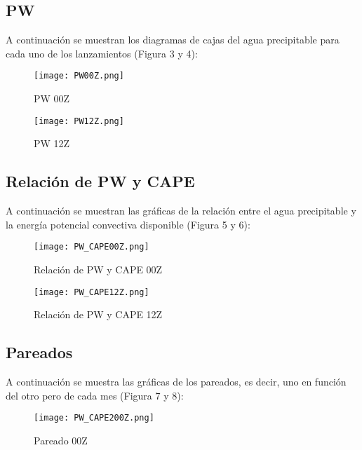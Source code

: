 \documentclass[12pt]{article}
\begin{document}
\subsection{PW}

A continuación se muestran los diagramas de cajas del agua precipitable para cada uno de los lanzamientos (Figura 3 y 4):

\begin{figure}
\begin{centering}
  \texttt{[image: PW00Z.png]}
  \caption{PW 00Z}
\end{centering}
\end{figure}

\begin{figure}
\begin{centering}
  \texttt{[image: PW12Z.png]}
  \caption{PW 12Z}
\end{centering}
\end{figure}

\subsection{Relación de PW y CAPE}

A continuación se muestran las gráficas de la relación entre el agua precipitable y la energía potencial convectiva disponible (Figura 5 y 6):

\begin{figure}
\begin{centering}
  \texttt{[image: PW\_CAPE00Z.png]}
  \caption{Relación de PW y CAPE 00Z}
\end{centering}
\end{figure}

\begin{figure}
\begin{centering}
  \texttt{[image: PW\_CAPE12Z.png]}
  \caption{Relación de PW y CAPE 12Z}
\end{centering}
\end{figure}

\subsection{Pareados}

A continuación se muestra las gráficas de los pareados, es decir, uno en función del otro pero de cada mes (Figura 7 y 8):

\begin{figure}
\begin{centering}
  \texttt{[image: PW\_CAPE200Z.png]}
  \caption{Pareado 00Z}
\end{centering}
\end{figure}
\end{document}
